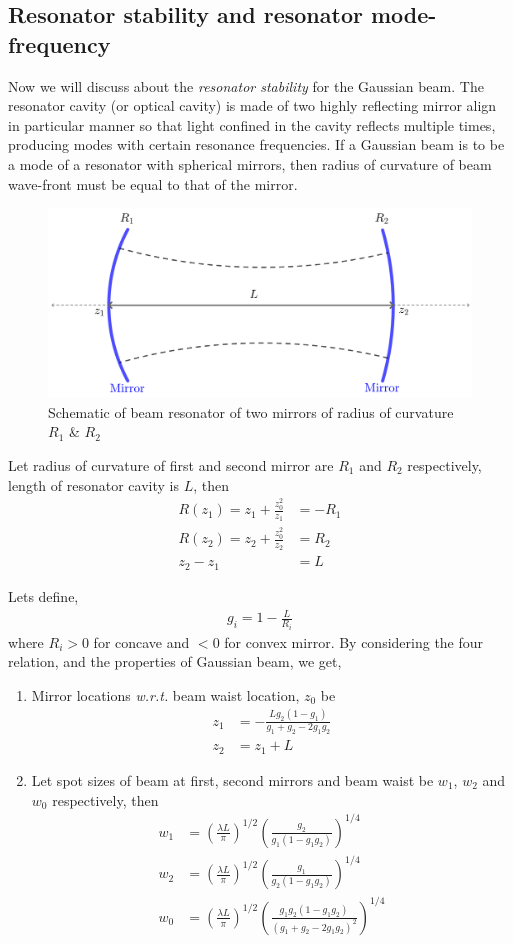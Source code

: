 \documentclass[11pt,a4paper]{article}
\numberwithin{equation}{section}
\begin{document}
\subsection{Resonator stability and resonator mode-frequency}
Now we will discuss about the \textit{resonator stability} for the Gaussian beam. The resonator cavity (or optical cavity) is made of two highly reflecting mirror align in particular manner so that  light confined in the cavity reflects multiple times, producing modes with certain resonance frequencies. \cite{opt cavity} If a Gaussian beam is to be a mode of a resonator with spherical mirrors, then radius of curvature of beam wave-front must be equal to that of the mirror.
\begin{figure}[H]
	\centering
	\includegraphics[width=0.6\linewidth]{resonator}
	\caption{Schematic of beam resonator of two mirrors of radius of curvature $R_1$ \& $R_2$}
	\label{fig:resonator}
\end{figure}

Let radius of curvature of first and second mirror are $R_1$ and $R_2$ respectively, length of resonator cavity is $L$, then \cite{milonni}
\begin{align}
	R(z_1)= z_1+\frac{z_0^2}{z_1}&=-R_1\\
	R(z_2)= z_2+\frac{z_0^2}{z_2}&= R_2\\
	z_2-z_1&=L
\end{align}

Lets define, 
\begin{align}
	g_i=1-\frac{L}{R_i}
\end{align}
where $R_i>0$ for concave and $<0$ for convex mirror. By considering the four relation, and the properties of Gaussian beam, we get, \cite{milonni}
\begin{enumerate}
	\item 
	Mirror locations \textit{w.r.t.} beam waist location, $z_0$ be
	\begin{align}
		z_1&=-\frac{Lg_2(1-g_1)}{g_1+g_2-2g_1g_2}\\
		z_2&=z_1+L
	\end{align}

	\item 
	Let spot sizes of beam at first, second mirrors and beam waist be $w_1$, $w_2$ and $w_0$ respectively, then
	\begin{align}
		w_1&= \left(\frac{\lambda L}{\pi}\right)^{1/2} \left(\frac{g_2}{g_1(1-g_1g_2)}\right)^{1/4}\\
		w_2&= \left(\frac{\lambda L}{\pi}\right)^{1/2} \left(\frac{g_1}{g_2(1-g_1g_2)}\right)^{1/4}\\
		w_0&= \left(\frac{\lambda L}{\pi}\right)^{1/2} \left(\frac{g_1g_2(1-g_1g_2)}{(g_1+g_2-2g_1g_2)^2}\right)^{1/4}
	\end{align}
\end{enumerate}
\end{document}

